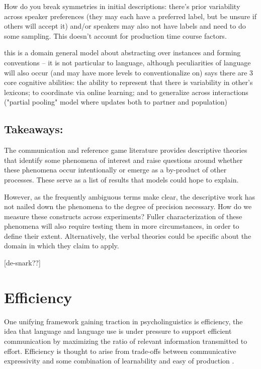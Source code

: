 \documentclass[]{article}
\begin{document}
\cite{hawkins2020b} How do you break symmetries in initial descriptions: there's prior variability across speaker preferences (they may each have a preferred label, but be unsure if others will accept it) and/or speakers may also not have labels and need to do some sampling. This doesn't account for production time course factors. 

this is a domain general model about abstracting over instances and forming conventions -- it is not particular to language, although peculiarities of language will also occur (and may have more levels to conventionalize on) 
\cite{hawkins2021} says there are 3 core cognitive abilities: the ability to represent that there is variability in other's lexicons; to coordinate via online learning; and to generalize across interactions ("partial pooling" model where updates both to partner and population) 

\subsection{Takeaways:} The communication and reference game literature provides descriptive theories that identify some phenomena of interest and raise questions around whether these phenomena occur intentionally or emerge as a by-product of other processes. These serve as a list of results that models could hope to explain. 

However, as the frequently ambiguous terms make clear, the descriptive work has not nailed down the phenomena to the degree of precision necessary. How do we measure these constructs across experiments? Fuller characterization of these phenomena will also require testing them in more circumstances, in order to define their extent. Alternatively, the verbal theories could be specific about the domain in which they claim to apply.  

[de-snark??]




\section{Efficiency}
One unifying framework gaining traction in psycholinguistics is efficiency, the idea that language and language use is under pressure to support efficient communication by maximizing the ratio of relevant information transmitted to effort. Efficiency is thought to arise from trade-offs between communicative expressivity and some combination of learnability and easy of production \cite{piantadosi2012, kirby2015}. 
\end{document}
